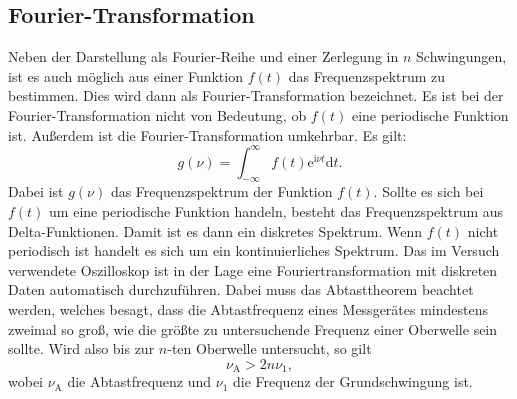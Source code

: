 \documentclass[
  bibliography=totoc,     %
  captions=tableheading,  %
  titlepage=firstiscover, %
]{scrartcl}
\begin{document}
\subsection{Fourier-Transformation}
Neben der Darstellung als Fourier-Reihe und einer Zerlegung in $n$ Schwingungen,
ist es auch möglich aus einer Funktion $f(t)$ das Frequenzspektrum zu bestimmen.
Dies wird dann als Fourier-Transformation bezeichnet. Es ist bei der Fourier-Transformation
nicht von Bedeutung, ob $f(t)$ eine periodische Funktion ist. Außerdem ist die
Fourier-Transformation umkehrbar. Es gilt:
\begin{equation}
	g(\nu)=\int_{-\infty}^{\infty}f(t)\mathup{e}^{\mathup{i}\nu t}\mathup{d}t.
	\label{eqn:fourier_trafo}
\end{equation}
Dabei ist $g(\nu)$ das Frequenzspektrum der Funktion $f(t)$. Sollte es sich bei
$f(t)$ um eine periodische Funktion handeln, besteht das Frequenzspektrum aus
Delta-Funktionen. Damit ist es dann ein diskretes Spektrum. Wenn $f(t)$ nicht
periodisch ist handelt es sich um ein kontinuierliches Spektrum. Das im Versuch
verwendete Oszilloskop ist in der Lage eine Fouriertransformation mit diskreten
Daten automatisch durchzuführen. Dabei muss das Abtasttheorem beachtet werden,
welches besagt, dass die Abtastfrequenz eines Messgerätes mindestens zweimal so
groß, wie die größte zu untersuchende Frequenz einer Oberwelle sein sollte. Wird
also bis zur $n$-ten Oberwelle untersucht, so gilt
\begin{equation}
	\nu_{\mathup{A}}>2n\nu_1,
	\label{eqn:abtasttheorem}
\end{equation}
wobei $\nu_{\mathup{A}}$ die Abtastfrequenz und $\nu_1$ die Frequenz der
Grundschwingung ist.
\end{document}
